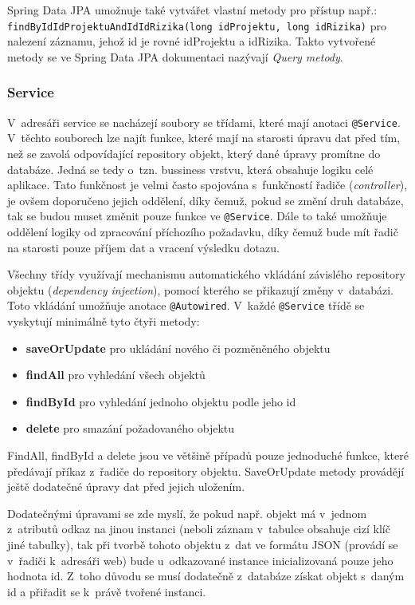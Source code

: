 Spring Data JPA umožnuje také vytvářet vlastní metody pro přístup např.: \texttt{findByIdId\-ProjektuAndIdIdRizika(long idProjektu, long idRizika)} pro nalezení záznamu, jehož id je rovné idProjektu a idRizika. Takto vytvořené metody se ve Spring Data JPA dokumentaci nazývají \textit{Query metody}.

\subsubsection *{Service}

V~adresáři service se nacházejí soubory se třídami, které mají anotaci \texttt{@Service}. V~těchto souborech lze najít funkce, které mají na starosti úpravu dat před tím, než se zavolá odpovídající repository objekt, který dané úpravy promítne do databáze.  Jedná se tedy o~tzn. bussiness vrstvu, která obsahuje logiku celé aplikace. Tato funkčnost je velmi často spojována s~funkčností řadiče (\textit{controller}), je ovšem doporučeno jejich oddělení, díky čemuž, pokud se změní druh databáze, tak se budou muset změnit pouze funkce ve \texttt{@Service}. Dále to také umožňuje oddělení logiky od zpracování příchozího požadavku, díky čemuž bude mít řadič na starosti pouze příjem dat a vracení výsledku dotazu.

Všechny třídy využívají mechanismu automatického vkládání závislého repository objektu (\textit{dependency injection}), pomocí kterého se přikazují změny v~databázi. Toto vkládání umožňuje anotace \texttt{@Autowired}. 
V~každé \texttt{@Service} třídě se vyskytují minimálně tyto čtyři metody:
\begin{itemize}
    \item \textbf{saveOrUpdate} pro ukládání nového či pozměněného objektu
    \item \textbf{findAll} pro vyhledání všech objektů
    \item \textbf{findById} pro vyhledání jednoho objektu podle jeho id
    \item \textbf{delete} pro smazání požadovaného objektu
\end{itemize}

FindAll, findById a delete jsou ve většině případů pouze jednoduché funkce, které předávají příkaz z~řadiče do repository objektu. SaveOrUpdate metody provádějí ještě dodatečné úpravy dat před jejich uložením.

Dodatečnými úpravami se zde myslí, že pokud např. objekt má v~jednom z~atributů odkaz na jinou instanci (neboli záznam v~tabulce obsahuje cizí klíč jiné tabulky), tak při tvorbě tohoto objektu z~dat ve formátu JSON (provádí se v~řadiči k~adresáři web) bude u~odkazované instance inicializovaná pouze jeho hodnota id. Z~toho důvodu se musí dodatečně z~databáze získat objekt s~daným id a přiřadit se k~právě tvořené instanci. 

